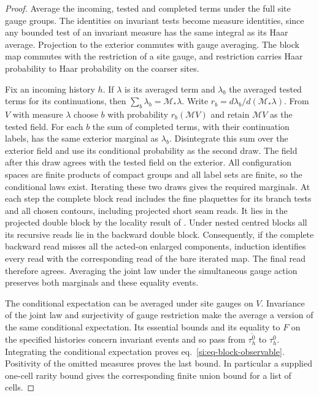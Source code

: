 \documentclass[11pt,letterpaper,reqno]{amsart}
\numberwithin{equation}{section}
\renewcommand{\eqref}[1]{\textup{eq.~\ref{#1}}}
\theoremstyle{definition}
\theoremstyle{remark}
\begin{document}
\begin{proof}
Average the incoming, tested and completed terms under the full site
gauge groups. The identities on invariant tests become measure
identities, since any bounded test of an invariant measure has the
same integral as its Haar average. Projection to the exterior
commutes with gauge averaging. The block map commutes with the
restriction of a site gauge, and restriction carries Haar probability
to Haar probability on the coarser sites.

Fix an incoming history $h$. If $\lambda$ is its averaged term and
$\lambda_b$ the averaged tested terms for its continuations, then
$\sum_b\lambda_b=\mathcal M_*\lambda$. Write
$r_b=d\lambda_b/d(\mathcal M_*\lambda)$. From $V$ with measure
$\lambda$ choose $b$ with probability $r_b(\mathcal M V)$ and retain
$\mathcal M V$ as the tested field. For each $b$ the sum of completed
terms, with their continuation labels, has the same exterior
marginal as $\lambda_b$. Disintegrate this sum over the exterior
field and use its conditional probability as the second draw. The
field after this draw agrees with the tested field on the exterior.
All configuration spaces are finite products of compact groups and
all label sets are finite, so the conditional laws exist. Iterating
these two draws gives the required marginals. At each step the complete block read includes the fine plaquettes
for its branch tests and all chosen contours, including projected
short seam reads. It lies in the projected double block by the
locality result of \cite{BA}. Under nested centred blocks all its
recursive reads lie in the backward double block. Consequently, if the complete backward read misses all the
acted-on enlarged components, induction identifies every read with
the corresponding read of the bare iterated map. The final read
therefore agrees. Averaging the joint law under the simultaneous
gauge action preserves both marginals and these equality events.

The conditional expectation can be averaged under site gauges on
$V$. Invariance of the joint law and surjectivity of gauge
restriction make the average a version of the same conditional
expectation. Its essential bounds and its equality to $F$ on the
specified histories concern invariant events and so pass from
$\overline{\tau_h^0}$ to $\tau_h^0$. Integrating the conditional
expectation proves \eqref{si:eq-block-observable}. Positivity of the
omitted measures proves the last bound. In particular a supplied
one-cell rarity bound gives the corresponding finite union bound
for a list of cells.
\end{proof}
\end{document}
